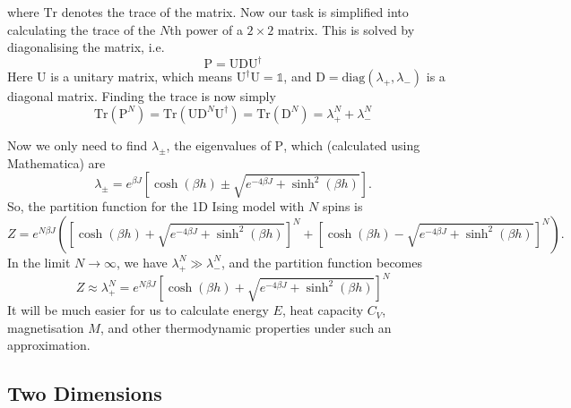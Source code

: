\documentclass[11pt]{article}
\newcommand{\bmat}[1]{\bm{\mathrm{#1}}}
\begin{document}
	where $\mathrm{Tr}$ denotes the trace of the matrix. Now our task is simplified into calculating the trace of the $N$th power of a $2 \times 2$ matrix. This is solved by diagonalising the matrix, i.e.
	\begin{equation} \label{eq:MatrixPDiagonal}
		\bmat{P} = \bmat{U}\bmat{D}\bmat{U}^\dagger
	\end{equation}
	Here $\bmat{U}$ is a unitary matrix, which means $\bmat{U}^\dagger \bmat{U} = \mathds{1}$, and $\bmat{D} = \mathrm{diag}(\lambda_+, \lambda_-)$ is a diagonal matrix. Finding the trace is now simply
	\begin{equation} \label{eq:MatrixPNTrace}
		\mathrm{Tr}(\bmat{P}^N) = \mathrm{Tr}(\bmat{U}\bmat{D}^N \bmat{U}^\dagger) = \mathrm{Tr}(\bmat{D}^N) = \lambda_+^N + \lambda_-^N
	\end{equation}

	Now we only need to find $\lambda_\pm$, the eigenvalues of $\bmat{P}$, which (calculated using Mathematica) are
	\begin{equation} \label{eq:MatrixPEigenvalues}
		\lambda_\pm = e^{\beta J} \left[\cosh(\beta h) \pm \sqrt{e^{-4\beta J}+\sinh^2(\beta h)}\right].
	\end{equation}
	So, the partition function for the 1D Ising model with $N$ spins is
	\begin{equation}\label{eq:PartitionFunction1DGeneralFinal}
		Z = e^{N \beta J} \left(\left[\cosh(\beta h) + \sqrt{e^{-4\beta J}+\sinh^2(\beta h)}\right]^N
		+ \left[\cosh(\beta h) - \sqrt{e^{-4\beta J}+\sinh^2(\beta h)}\right]^N\right).
	\end{equation}
	In the limit $N \to \infty$, we have $\lambda_+^N \gg \lambda_-^N$, and the partition function becomes
		\begin{equation} \label{eq:PartitionFunction1DGeneralLimit}
			Z \approx \lambda_+^N = e^{N \beta J} \left[\cosh(\beta h) + \sqrt{e^{-4\beta J}+\sinh^2(\beta h)}\right]^N
		\end{equation}
	It will be much easier for us to calculate energy $E$, heat capacity $C_V$, magnetisation $M$, and other thermodynamic properties under such an approximation.

	\subsection{Two Dimensions}
	
\end{document}
